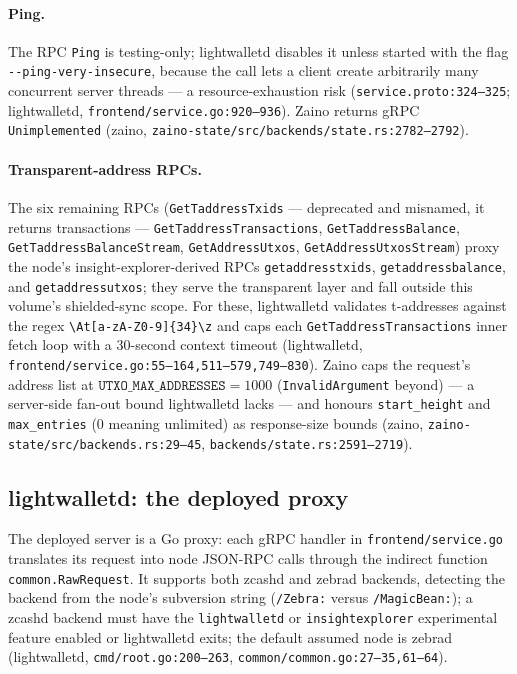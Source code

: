\documentclass[11pt,a4paper]{article}
\theoremstyle{definition}
\begin{document}
\paragraph{Ping.} The RPC \texttt{Ping} is testing-only; lightwalletd
disables it unless started with the flag
\texttt{-{}-ping-very-insecure}, because the call lets a client create
arbitrarily many concurrent server threads --- a
resource-exhaustion risk (\texttt{service.proto:324--325};
\textsf{lightwalletd}, \texttt{frontend/service.go:920--936}). Zaino
returns gRPC \texttt{Unimplemented} (\textsf{zaino},
\texttt{zaino-state/src/backends/state.rs:2782--2792}).

\paragraph{Transparent-address RPCs.} The six remaining RPCs
(\texttt{GetTaddressTxids} --- deprecated and misnamed, it returns
transactions --- \texttt{GetTaddressTransactions},
\texttt{GetTaddressBalance}, \texttt{GetTaddressBalanceStream},
\texttt{GetAddressUtxos}, \texttt{GetAddressUtxosStream}) proxy the
node's insight-explorer-derived RPCs \texttt{getaddresstxids},
\texttt{getaddressbalance}, and \texttt{getaddressutxos}; they serve the
transparent layer and fall outside this volume's shielded-sync scope.
For these, lightwalletd validates t-addresses against the regex
\texttt{\textbackslash At[a-zA-Z0-9]\{34\}\textbackslash z} and caps each
\texttt{GetTaddressTransactions} inner fetch loop with a 30-second
context timeout (\textsf{lightwalletd},
\texttt{frontend/service.go:55--164,511--579,749--830}). Zaino caps the
request's address list at $\mathtt{UTXO\_MAX\_ADDRESSES} = 1000$
(\texttt{InvalidArgument} beyond) --- a server-side fan-out bound
lightwalletd lacks --- and honours \texttt{start\_height} and
\texttt{max\_entries} ($0$ meaning unlimited) as response-size bounds
(\textsf{zaino}, \texttt{zaino-state/src/backends.rs:29--45},
\texttt{backends/state.rs:2591--2719}).

\subsection{lightwalletd: the deployed proxy}\label{sec:sync-lwd}

The deployed server is a Go proxy: each gRPC handler in
\texttt{frontend/service.go} translates its request into node JSON-RPC
calls through the indirect function \texttt{common.RawRequest}. It
supports both zcashd and zebrad backends, detecting the backend from the
node's subversion string (\texttt{/Zebra:} versus \texttt{/MagicBean:});
a zcashd backend must have the \texttt{lightwalletd} or
\texttt{insightexplorer} experimental feature enabled or lightwalletd
exits; the default assumed node is zebrad (\textsf{lightwalletd},
\texttt{cmd/root.go:200--263}, \texttt{common/common.go:27--35,61--64}).
\end{document}
